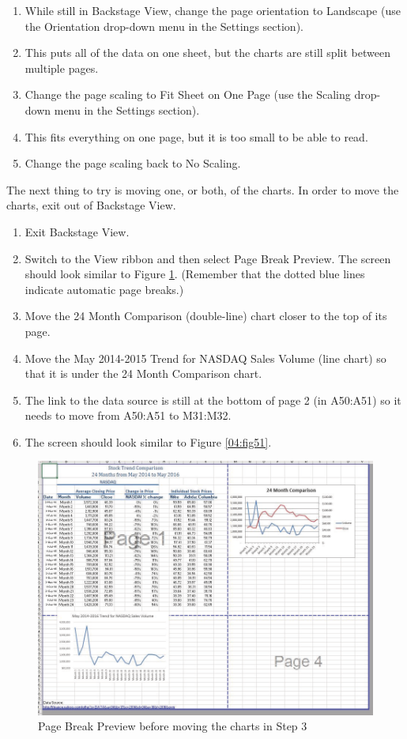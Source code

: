 \begin{enumerate}
	\item While still in Backstage View, change the page orientation to Landscape (use the Orientation drop-down menu in the Settings section).
	\item This puts all of the data on one sheet, but the charts are still split between multiple pages.
	\item Change the page scaling to Fit Sheet on One Page (use the Scaling drop-down menu in the Settings section).
	\item This fits everything on one page, but it is too small to be able to read.
	\item Change the page scaling back to No Scaling.
\end{enumerate}

The next thing to try is moving one, or both, of the charts. In order to move the charts, exit out of Backstage View.

\begin{enumerate}
	\item Exit Backstage View.
	\item Switch to the View ribbon and then select Page Break Preview. The screen should look similar to Figure \ref{04:fig50}. (Remember that the dotted blue lines indicate automatic page breaks.)
	\item Move the 24 Month Comparison (double-line) chart closer to the top of its page.
	\item Move the May 2014-2015 Trend for NASDAQ Sales Volume (line chart) so that it is under the 24 Month Comparison chart.
	\item The link to the data source is still at the bottom of page 2 (in \textsf{A50:A51}) so it needs to move from \textsf{A50:A51} to \textsf{M31:M32}.
	\item The screen should look similar to Figure \ref{04:fig51}.
\end{enumerate}

\begin{figure}[H]
	\centering
	\includegraphics[width=\maxwidth{.95\linewidth}]{gfx/ch04_fig50}
	\caption{Page Break Preview before moving the charts in Step 3}
	\label{04:fig50}
\end{figure}

